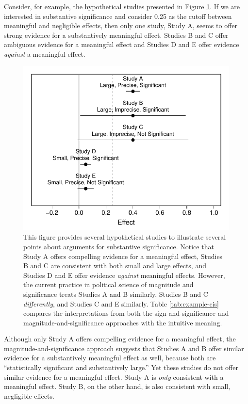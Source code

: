 \documentclass[12pt]{article}
\begin{document}
Consider, for example, the hypothetical studies presented in Figure \ref{fig:example-cis}. If we are interested in substantive significance and consider 0.25 as the cutoff between meaningful and negligible effects, then only one study, Study A, seems to offer strong evidence for a substantively meaningful effect. Studies B and C offer ambiguous evidence for a meaningful effect and Studies D and E offer evidence \emph{against} a meaningful effect.

\begin{figure}[H]
\begin{center}
\includegraphics[scale = .8]{figs/example-cis.pdf}
\caption{This figure provides several hypothetical studies to illustrate several points about arguments for substantive significance. Notice that Study A offers compelling evidence for a meaningful effect, Studies B and C are consistent with both small and large effects, and Studies D and E offer evidence \emph{against} meaningful effects. However, the current practice in political science of magnitude and significance treats Studies A and B similarly, Studies B and C \emph{differently}, and Studies C and E similarly. Table \ref{tab:example-cis} compares the interpretations from both the sign-and-significance and magnitude-and-significance approaches with the intuitive meaning.}\label{fig:example-cis}
\end{center}
\end{figure}

Although only Study A offers compelling evidence for a meaningful effect, the magnitude-and-significance approach suggests that Studies A and B offer similar evidence for a substantively meaningful effect as well, because both are ``statistically significant and substantively large.''  Yet these studies do not offer similar evidence for a meaningful effect. Study A is \textit{only} consistent with a meaningful effect. Study B, on the other hand, is also consistent with small, negligible effects.
\end{document}
